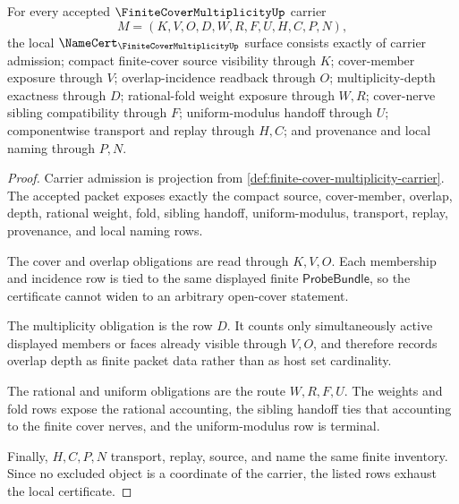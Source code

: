 \begin{theorem}
\label{thm:finite-cover-multiplicity-namecert-obligations}
For every accepted $\FiniteCoverMultiplicityUp$ carrier
$$
M=(K,V,O,D,W,R,F,U,H,C,P,N),
$$
the local $\NameCert_{\FiniteCoverMultiplicityUp}$ surface consists exactly of carrier admission; compact finite-cover source visibility through $K$; cover-member exposure through $V$; overlap-incidence readback through $O$; multiplicity-depth exactness through $D$; rational-fold weight exposure through $W,R$; cover-nerve sibling compatibility through $F$; uniform-modulus handoff through $U$; componentwise transport and replay through $H,C$; and provenance and local naming through $P,N$.
\end{theorem}
\begin{proof}
Carrier admission is projection from \autoref{def:finite-cover-multiplicity-carrier}. The accepted packet exposes exactly the compact source, cover-member, overlap, depth, rational weight, fold, sibling handoff, uniform-modulus, transport, replay, provenance, and local naming rows.

The cover and overlap obligations are read through $K,V,O$. Each membership and incidence row is tied to the same displayed finite $\mathsf{ProbeBundle}$, so the certificate cannot widen to an arbitrary open-cover statement.

The multiplicity obligation is the row $D$. It counts only simultaneously active displayed members or faces already visible through $V,O$, and therefore records overlap depth as finite packet data rather than as host set cardinality.

The rational and uniform obligations are the route $W,R,F,U$. The weights and fold rows expose the rational accounting, the sibling handoff ties that accounting to the finite cover nerves, and the uniform-modulus row is terminal.

Finally, $H,C,P,N$ transport, replay, source, and name the same finite inventory. Since no excluded object is a coordinate of the carrier, the listed rows exhaust the local certificate.
\end{proof}


